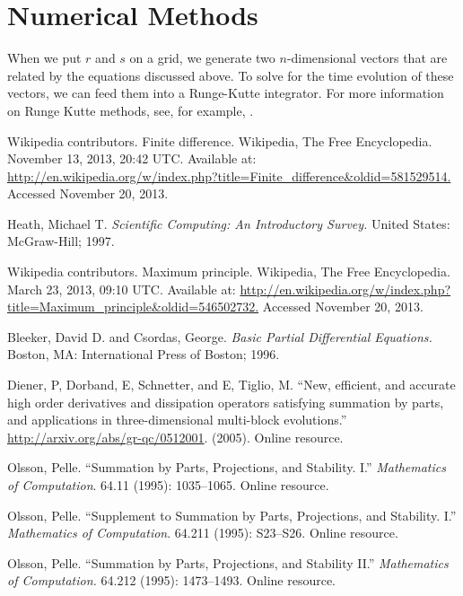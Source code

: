 \documentclass[]{article}
\begin{document}
\section{Numerical Methods}

When we put $r$ and $s$ on a grid, we generate two $n$-dimensional
vectors that are related by the equations discussed above. To solve
for the time evolution of these vectors, we can feed them into a
Runge-Kutte integrator. For more information on Runge Kutte methods,
see, for example, \cite{Heath}.

\begin{thebibliography}{8}

 Wikipedia contributors. Finite difference. Wikipedia, The Free Encyclopedia. November 13, 2013, 20:42 UTC. Available at: \url{http://en.wikipedia.org/w/index.php?title=Finite_difference&oldid=581529514.} Accessed November 20, 2013. 

 Heath, Michael T. \textit{Scientific Computing: An Introductory Survey.} United States: McGraw-Hill; 1997.

 Wikipedia contributors. Maximum principle. Wikipedia, The Free Encyclopedia. March 23, 2013, 09:10 UTC. Available at: \url{http://en.wikipedia.org/w/index.php?title=Maximum_principle&oldid=546502732.} Accessed November 20, 2013. 

 Bleeker, David D. and Csordas, George. \textit{Basic Partial Differential Equations.} Boston, MA: International Press of Boston; 1996.

 Diener, P, Dorband, E, Schnetter, and E, Tiglio, M. ``New, efficient, and accurate high order derivatives and dissipation operators satisfying summation by parts, and applications in three-dimensional multi-block evolutions.'' \href{arXiv:gr-qc/0512001}{http://arxiv.org/abs/gr-qc/0512001}. (2005). Online resource.

 Olsson, Pelle. ``Summation by Parts, Projections, and Stability. I.'' \textit{Mathematics of Computation}. 64.11 (1995): 1035--1065. Online resource.

 Olsson, Pelle. ``Supplement to Summation by Parts, Projections, and Stability. I.'' \textit{Mathematics of Computation}. 64.211 (1995): S23--S26. Online resource.

 Olsson, Pelle. ``Summation by Parts, Projections, and Stability II.'' \textit{Mathematics of Computation.} 64.212 (1995): 1473--1493. Online resource.

\end{thebibliography}
\end{document}
